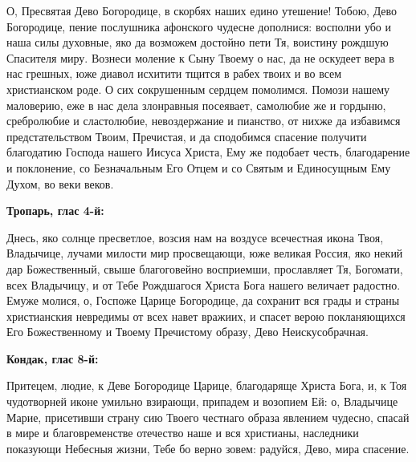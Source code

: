 \bigskip\bigskip\mychapterending

 

О, Пресвятая Дево Богородице, в скорбях наших едино утешение! Тобою, Дево Богородице, пение послушника афонского чудесне дополнися: восполни убо и наша силы духовные, яко да возможем достойно пети Тя, воистину рождшую Спасителя миру. Вознеси моление к Сыну Твоему о нас, да не оскудеет вера в нас грешных, юже диавол исхитити тщится в рабех твоих и во всем христианском роде. О сих сокрушенным сердцем помолимся. Помози нашему маловерию, еже в нас дела злонравныя посеявает, самолюбие же и гордыню, сребролюбие и сластолюбие, невоздержание и пианство, от нихже да избавимся предстательством Твоим, Пречистая, и да сподобимся спасение получити благодатию Господа нашего Иисуса Христа, Ему же подобает честь, благодарение и поклонение, со Безначальным Его Отцем и со Святым и Единосущным Ему Духом, во веки веков.


\bigskip\bigskip\mychapterending

 


\bfseries Тропарь, глас 4-й:\normalfont{}\nopagebreak


Днесь, яко солнце пресветлое, возсия нам на воздусе всечестная икона Твоя, Владычице, лучами милости мир просвещающи, юже великая Россия, яко некий дар Божественный, свыше благоговейно восприемши, прославляет Тя, Богомати, всех Владычицу, и от Тебе Рождшагося Христа Бога нашего величает радостно. Емуже молися, о, Госпоже Царице Богородице, да сохранит вся грады и страны христианския невредимы от всех навет вражиих, и спасет верою покланяющихся Его Божественному и Твоему Пречистому образу, Дево Неискусобрачная.


\medskip


\bfseries Кондак, глас 8-й:\normalfont{}\nopagebreak


Притецем, людие, к Деве Богородице Царице, благодаряще Христа Бога, и, к Тоя чудотворней иконе умильно взирающи, припадем и возопием Ей: о, Владычице Марие, присетивши страну сию Твоего честнаго образа явлением чудесно, спасай в мире и благовременстве отечество наше и вся христианы, наследники показующи Небесныя жизни, Тебе бо верно зовем: радуйся, Дево, мира спасение.


